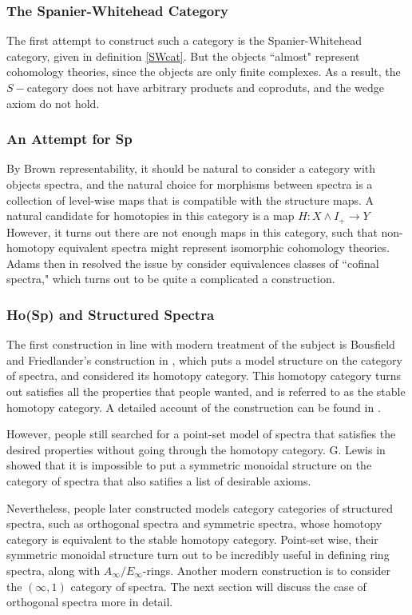 \documentclass{article}
\theoremstyle{definition}
\begin{document}
\subsubsection{The Spanier-Whitehead Category}
The first attempt to construct such a category is the Spanier-Whitehead category, given in definition \ref{SWcat}. But the objects ``almost" represent cohomology theories, since the objects are only finite complexes. As a result, the $S-$category does not have arbitrary products and coproduts, and the wedge axiom do not hold. 
\subsubsection{An Attempt for \textrm{Sp}}
By Brown representability, it should be natural to consider a category with objects spectra, and the natural choice for morphisms between spectra is a collection of level-wise maps that is compatible with the structure maps. A natural candidate for homotopies in this category is a map $H: X\wedge I_{+}\to Y$ However, it turns out there are not enough maps in this category, such that non-homotopy equivalent spectra might represent isomorphic cohomology theories. Adams then in \cite{Adams74} resolved the issue by consider equivalences classes of ``cofinal spectra," which turns out to be quite a complicated a construction. 

\subsubsection{\textrm{Ho(Sp)} and Structured Spectra}
The first construction in line with modern treatment of the subject is Bousfield and Friedlander's construction in \cite{BF78}, which puts a model structure on the category of spectra, and considered its homotopy category. This homotopy category turns out satisfies all the properties that people wanted, and is referred to as the stable homotopy category. A detailed account of the construction can be found in \cite{BR}.

However, people still searched for a point-set model of spectra that satisfies the desired properties without going through the homotopy category. G. Lewis in \cite{Lew91} showed that it is impossible to put a symmetric monoidal structure on the category of spectra that also satifies a list of desirable axioms. 

Nevertheless, people later constructed models category categories of structured spectra, such as orthogonal spectra and symmetric spectra, whose homotopy category is equivalent to the stable homotopy category. Point-set wise, their symmetric monoidal structure turn out to be incredibly useful in defining ring spectra, along with $A_{\infty}/E_{\infty}$-rings. Another modern construction is to consider the $(\infty,1)$ category of spectra. The next section will discuss the case of orthogonal spectra more in detail. 
\end{document}

